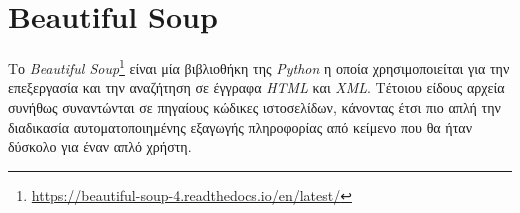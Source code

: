 \section{Beautiful Soup}
\label{sec:soup}
Το \emph{Beautiful Soup}\footnote{\url{https://beautiful-soup-4.readthedocs.io/en/latest/}} είναι μία βιβλιοθήκη της \emph{Python} η οποία χρησιμοποιείται για την επεξεργασία και την αναζήτηση σε έγγραφα \emph{HTML} και \emph{XML}. Τέτοιου είδους αρχεία συνήθως συναντώνται σε πηγαίους κώδικες ιστοσελίδων, κάνοντας έτσι πιο απλή την διαδικασία αυτοματοποιημένης εξαγωγής πληροφορίας από κείμενο που θα ήταν δύσκολο για έναν απλό χρήστη.